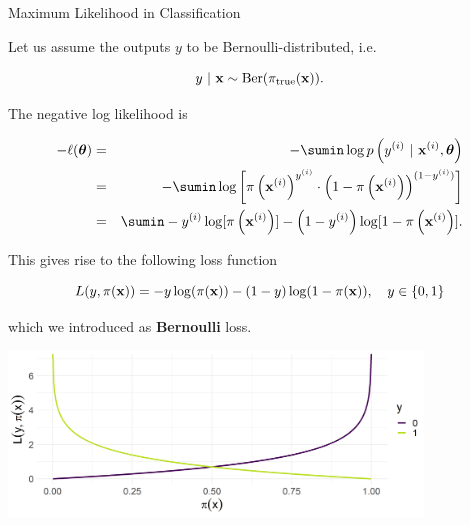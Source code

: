 \documentclass[11pt,compress,t,notes=noshow, xcolor=table]{beamer}
\begin{document}
\begin{vbframe}{Maximum Likelihood in Classification}

Let us assume the outputs $y$ to be Bernoulli-distributed, i.e.  

$$
  y ~|~ \mathbf{x} \sim \text{Ber}(\pi_\text{true}(\mathbf{x})). 
$$

The negative log likelihood is

\begin{eqnarray*}
- \loglt &=& -\sumin \lpdfyigxit \\ 
&=& - \sumin \log \left[\pi\left(\xi\right)^{y^{(i)}} \cdot \left(1 - \pi\left(\xi\right)\right)^{(1 - y^{(i)})} \right]\\
&=& \sumin -\yi \log[\pi\left(\xi\right)] - \left(1-\yi\right) \log [1 - \pi\left(\xi\right)]. 
\end{eqnarray*}


\framebreak 

This gives rise to the following loss function 

$$
  L(y, \pi(\mathbf{x})) = -y\log(\pi(\mathbf{x}))-(1-y)\log(1-\pi(\mathbf{x})), \quad y \in \{0, 1\}
$$

which we introduced as \textbf{Bernoulli} loss. 

\vspace{0.2cm}

\begin{center}
\includegraphics[width = 11cm ]{figure/plot_bernoulli_prob.png} \\
\end{center}








\end{vbframe}
\end{document}
